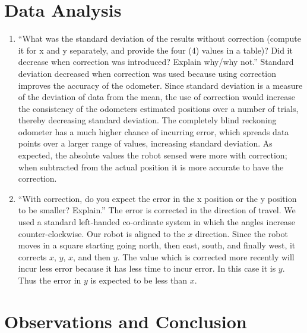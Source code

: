 \documentclass[twocolumn]{article}
\begin{document}
\section{Data Analysis}

\begin{enumerate}

\item ``What was the standard deviation of the results without correction (compute it for x and y separately, and provide the four (4) values in a table)? Did it decrease when correction was introduced? Explain why/why not.\cite{lab2}'' Standard deviation decreased when correction was used because using correction improves the accuracy of the odometer. Since standard deviation is a measure of the deviation of data from the mean, the use of correction would increase the consistency of the odometers estimated positions over a number of trials, thereby decreasing standard deviation. The completely blind reckoning odometer has a much higher chance of incurring error, which spreads data points over a larger range of values, increasing standard deviation. As expected, the absolute values the robot sensed were more with correction; when subtracted from the actual position it is more accurate to have the correction.

\item ``With correction, do you expect the error in the x position or the y position to be smaller? Explain.'' The error is corrected in the direction of travel. We used a standard left-handed co-ordinate system in which the angles increase counter-clockwise. Our robot is aligned to the $x$ direction.
Since the robot moves in a square starting going north, then east, south, and finally west, it corrects $x$, $y$, $x$, and then $y$. The value which is corrected more recently will incur less error because it has less time to incur error. In this case it is $y$. Thus the error in $y$ is expected to be less than $x$.

\end{enumerate}

\section{Observations and Conclusion}
\end{document}
